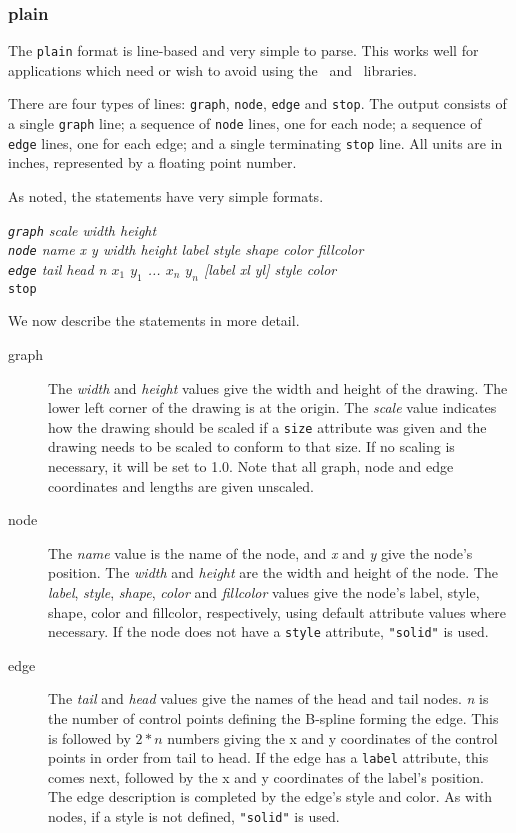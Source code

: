 \subsubsection{plain}

The {\tt plain} format is line-based and very simple to parse. This works
well for applications which need or wish to avoid using the \graph\
and \agraph\ libraries.

There are four types of lines: {\tt graph}, {\tt node}, 
{\tt edge} and {\tt stop}. The output
consists of a single {\tt graph} line; a sequence of {\tt node} lines, one
for each node; a sequence of {\tt edge} lines, one for each edge; and
a single terminating {\tt stop} line. All units are in inches,
represented by a floating point number. 

As noted, the statements have very simple formats.
\begin{tabbing}
\indent \indent \= {\em {\tt graph} scale width height} \\
        \> {\em {\tt node} name x y width height label style shape color fillcolor} \\
        \> {\em {\tt edge} tail head n $x_1$ $y_1$ ... $x_n$ $y_n$ [label xl yl] style color} \\
        \> {\tt stop}
\end{tabbing}
       
We now describe the statements in more detail.
\begin{description}
\item[graph] 
The {\em width} and {\em height} values give the 
width and height of the drawing. The 
lower left corner of the drawing is at the origin. 
The {\em scale} value indicates 
how the drawing should be scaled if a {\tt size} attribute was given and the 
drawing needs to be scaled to conform to that size. If no scaling is 
necessary, it will be set to 1.0. Note that all graph, node and edge 
coordinates and lengths are given unscaled. 
\item[node] 
The {\em name} value is the name of the node, and 
{\em x} and {\em y} give the node's position. 
The {\em width} and {\em height} are the width and height of the node. 
The {\em label}, {\em style},
{\em shape}, {\em color} and {\em fillcolor} values 
give the node's label, style, shape, color and 
fillcolor, respectively, using default attribute values where necessary. 
If the node does not have a {\tt style} attribute, {\tt "solid"} is used. 
\item[edge] 
The {\em tail} and {\em head} values give the names of the head and tail nodes. 
{\em n} is the number of control points defining the B-spline forming the edge.
This is followed by $2*n$ numbers giving the x and y coordinates of the 
control points in order from tail to head. If the edge has a {\tt label}
attribute, 
this comes next, followed by the x and y coordinates of the label's position. 
The edge description is completed by the edge's style and color. As with 
nodes, if a style is not defined, {\tt "solid"} is used. 
\end{description}

